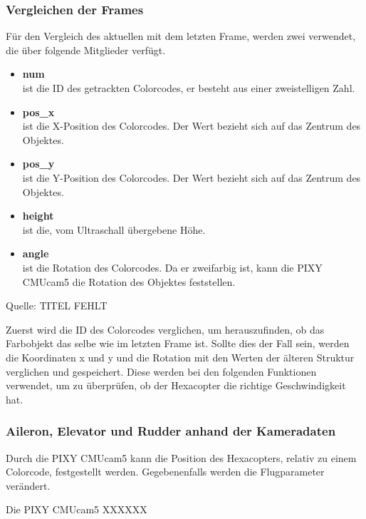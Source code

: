     \subsubsection{Vergleichen der Frames}
    Für den Vergleich des aktuellen mit dem letzten Frame, werden zwei  verwendet, die über folgende Mitglieder verfügt.
    \begin{itemize}
      \item \textbf{num}\\
      ist die ID des getrackten Colorcodes, er besteht aus einer zweistelligen Zahl.
      \item \textbf{pos\_x}\\
      ist die X-Position des Colorcodes. Der Wert bezieht sich auf das Zentrum des Objektes.
      \item \textbf{pos\_y}\\
      ist die Y-Position des Colorcodes. Der Wert bezieht sich auf das Zentrum des Objektes.
      \item \textbf{height}\\
      ist die, vom Ultraschall übergebene Höhe.
      \item \textbf{angle}\\
      ist die Rotation des Colorcodes. Da er zweifarbig ist, kann die PIXY CMUcam5 die Rotation des Objektes feststellen.
    \end{itemize}

    Quelle: TITEL FEHLT \cite{Structs}

    Zuerst wird die ID des Colorcodes verglichen, um herauszufinden, ob das Farbobjekt das selbe wie im letzten Frame ist.
    Sollte dies der Fall sein, werden die Koordinaten x und y und die Rotation mit den Werten der älteren Struktur verglichen und gespeichert.
    Diese werden bei den folgenden Funktionen verwendet, um zu überprüfen, ob der Hexacopter die richtige Geschwindigkeit hat.

    \subsubsection{Aileron, Elevator und Rudder anhand der Kameradaten}
    Durch die PIXY CMUcam5 kann die Position des Hexacopters, relativ zu einem Colorcode, festgestellt werden. Gegebenenfalls werden die Flugparameter verändert.

    Die PIXY CMUcam5 XXXXXX %



